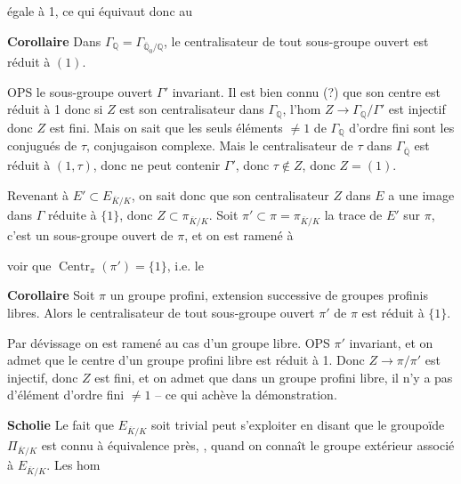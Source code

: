 \documentclass[11pt,a4paper]{article}
\begin{document}
égale à 1, ce qui équivaut donc au

\textbf{Corollaire} Dans $\Gamma_{\mathbb{Q}} = \Gamma_{\overline{\mathbb{Q}}_0/\mathbb{Q}}$, le centralisateur de tout sous-groupe ouvert est réduit à $(1)$.

OPS le sous-groupe ouvert $\Gamma'$ invariant. Il est bien connu (?) que son centre est réduit à 1 donc si $Z$ est son centralisateur dans $\Gamma_{\mathbb{Q}}$, l'hom $Z \to \Gamma_{\mathbb{Q}}/\Gamma'$ est injectif donc $Z$ est fini. Mais on sait que les seuls éléments $\neq 1$ de $\Gamma_{\mathbb{Q}}$ d'ordre fini sont les conjugués de $\tau$, conjugaison complexe. Mais le centralisateur de $\tau$ dans $\Gamma_{\overline{\mathbb{Q}}}$ est réduit à $(1, \tau)$, donc ne peut contenir $\Gamma'$, donc $\tau \notin Z$, donc $Z = (1)$.

Revenant à $E' \subset E_{\overline{K}/K}$, on sait donc que son centralisateur $Z$ dans $E$ a une image dans $\Gamma$ réduite à $\{1\}$, donc $Z \subset \pi_{\overline{K}/K}$. Soit $\pi' \subset \pi = \pi_{\overline{K}/K}$ la trace de $E'$ sur $\pi$, c'est un sous-groupe ouvert de $\pi$, et on est ramené à

voir que $\operatorname{Centr}_\pi(\pi') = \{1\}$, i.e. le

\textbf{Corollaire} Soit $\pi$ un groupe profini, extension successive de groupes profinis libres. Alors le centralisateur  de tout sous-groupe ouvert $\pi'$ de $\pi$ est réduit à $\{1\}$.

Par dévissage on est ramené au cas d'un groupe  libre.  OPS $\pi'$ invariant, et on admet que  le centre d'un groupe profini libre est réduit à 1.
Donc $Z \to \pi/\pi'$ est injectif, donc $Z$ est fini, et on admet que dans un groupe profini libre, il n'y a pas d'élément d'ordre fini $\neq 1$
-- ce qui achève la démonstration.

\textbf{Scholie} Le fait que $E_{\overline{K}/K}$ soit   \struck{\ill{}}  trivial peut s'exploiter en disant que le groupoïde $\Pi_{\overline{K}/K}$  est connu à équivalence près, \struck{\ill{}} , quand on connaît le groupe extérieur associé à $E_{\overline{K}/K}$. Les hom
\end{document}
